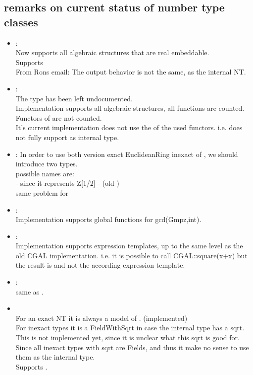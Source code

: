 \subsection{remarks on current status of number type classes}
\begin{itemize}
\item {}:\\
      Now supports all algebraic structures that are real embeddable.\\
      Supports \\ 
      From Rons email: The output behavior is not the same, as the internal NT. 

\item {}:\\
        The type has been left undocumented.\\
        Implementation supports all algebraic structures, all functions are counted.\\
        Functors of  are not counted. \\
        It's current implementation does not use the  of the used 
        functors. i.e. does not fully support  as internal type. \\
         
\item {}: 
In order to use both version exact {EuclideanRing} inexact  
of , we should  introduce two types. \\
possible names are: \\
      -  since it represents Z[1/2]
      - (old ) \\
      same problem for 
\item {}:\\
       Implementation supports global functions for gcd(Gmpz,int).
\item {}:\\
       Implementation supports expression templates, 
       up to the same level as the old CGAL implementation.       
       i.e. it is possible to call CGAL::square(x+x) but the result is 
        and not the according expression template.  
\item {}:\\
        same as .
\item {}\\
        For an exact NT it is always a model of . (implemented)\\
        For inexact types it is a FieldWithSqrt in case the internal type has a sqrt.
        This is not implemented yet, since it is unclear what this sqrt is good for. 
        Since all inexact types with sqrt are Fields, and thus it make no sense to use 
        them as the internal type.  \\
        Supports . 


\end{itemize}
